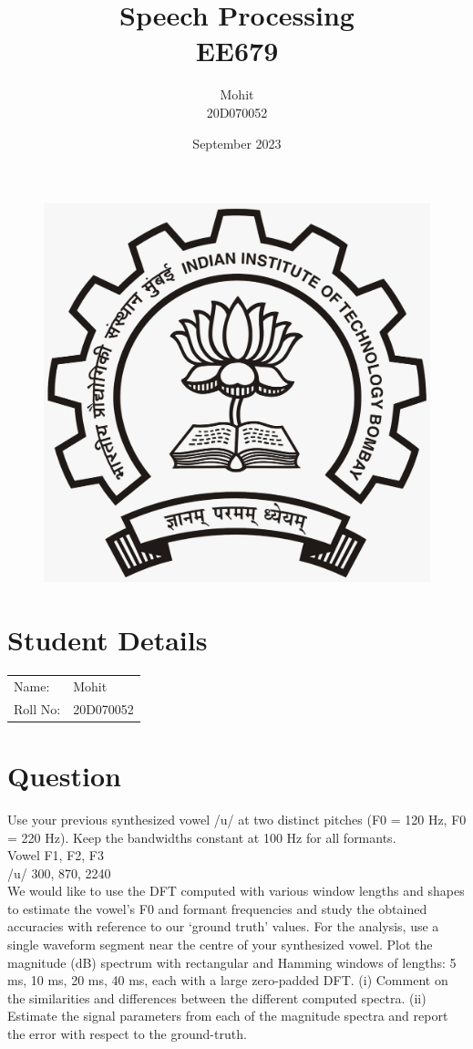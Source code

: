 \documentclass{article}
\title{Speech Processing\\EE679}
\author{Mohit\\20D070052 }
\date{September 2023}
\begin{document}
\maketitle
\begin{figure}[H]
\begin{center}
\includegraphics[scale = 0.2]{LOGO.jpeg}
\end{center}
\end{figure}
\section{Student Details}
\begin{tabular}{ l l  }
 Name: & Mohit \\ 
 Roll No: & 20D070052  \\  
\end{tabular}

\newpage

\section{Question}

Use your previous synthesized vowel /u/ at two distinct pitches (F0 = 120 Hz, F0 = 220 Hz). Keep the bandwidths constant at 100 Hz for all formants. \\
Vowel F1, F2, F3 \\
/u/ 300, 870, 2240\\
We would like to use the DFT computed with various window lengths and shapes to estimate the vowel’s F0 and formant frequencies and study the obtained accuracies with reference to our ‘ground truth’ values. For the analysis, use a single waveform segment near the centre of your synthesized vowel. Plot the magnitude (dB) spectrum with rectangular and Hamming windows of lengths: 5 ms, 10 ms, 20 ms, 40 ms, each with a large zero-padded DFT. (i) Comment on the similarities and differences between the different computed spectra. (ii) Estimate the signal parameters from each of the magnitude spectra and report the error with respect to the ground-truth.
\end{document}
